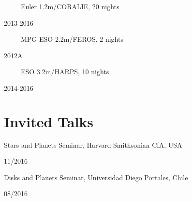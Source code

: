 \documentclass[11pt, a4paper]{article} %
\begin{document}
\begin{minipage}[t]{0.7\textwidth}
\ \ \ \ \ Euler 1.2m/CORALIE, 20 nights
\end{minipage}
\begin{minipage}[t]{0.3\textwidth}
\hfill 2013-2016
\end{minipage}

\begin{minipage}[t]{0.7\textwidth}
\ \ \ \ \ MPG-ESO 2.2m/FEROS, 2 nights
\end{minipage}
\begin{minipage}[t]{0.3\textwidth}
\hfill 2012A
\end{minipage}

\begin{minipage}[t]{0.7\textwidth}
\ \ \ \ \ ESO 3.2m/HARPS, 10 nights
\end{minipage}
\begin{minipage}[t]{0.3\textwidth}
\hfill 2014-2016
\end{minipage}
\section*{Invited Talks}

\begin{minipage}[t]{0.7\textwidth}
\begin{flushleft}%
  \setlength{\leftskip}{0.2cm}%
Stars and Planets Seminar, Harvard-Smithsonian CfA, USA
\end{flushleft}
\end{minipage}
\begin{minipage}[t]{0.3\textwidth}
\hfill 11/2016
\end{minipage}

\begin{minipage}[t]{0.7\textwidth}
\begin{flushleft}%
  \setlength{\leftskip}{0.2cm}%
Disks and Planets Seminar, Universidad Diego Portales, Chile
\end{flushleft}
\end{minipage}
\begin{minipage}[t]{0.3\textwidth}
\hfill 08/2016
\end{minipage}
\end{document}
